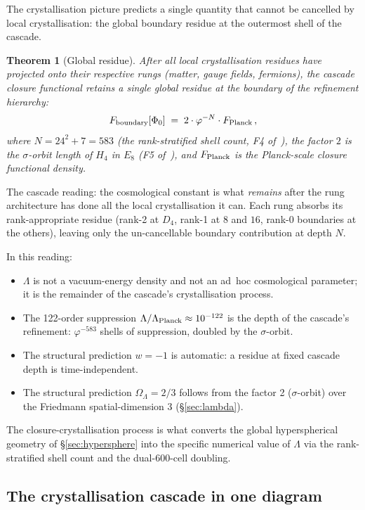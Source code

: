 \documentclass[11pt]{article}
\theoremstyle{plain}
\newtheorem{theorem}{Theorem}[section]
\theoremstyle{definition}
\theoremstyle{remark}
\begin{document}
The crystallisation picture predicts a single quantity that cannot be cancelled by local crystallisation: the global boundary residue at the outermost shell of the cascade.

\begin{theorem}[Global residue]\label{thm:global-residue}
After all local crystallisation residues have projected onto their respective rungs (matter, gauge fields, fermions), the cascade closure functional retains a single global residue at the boundary of the refinement hierarchy:
\[
  F_{\rm boundary}[\Phi_0] \;=\; 2 \cdot \varphi^{-N} \cdot F_{\rm Planck} \,,
\]
where $N = 24^2 + 7 = 583$ (the rank-stratified shell count, F4 of~\citealp{SmartXXXVI}), the factor $2$ is the $\sigma$-orbit length of $H_4$ in $E_8$ (F5 of~\citealp{SmartXXXVI}), and $F_{\rm Planck}$ is the Planck-scale closure functional density.
\end{theorem}

The cascade reading: the cosmological constant is what \emph{remains} after the rung architecture has done all the local crystallisation it can. Each rung absorbs its rank-appropriate residue (rank-2 at $D_4$, rank-1 at $8$ and $16$, rank-0 boundaries at the others), leaving only the un-cancellable boundary contribution at depth $N$.

In this reading:
\begin{itemize}[leftmargin=2em]
\item $\Lambda$ is not a vacuum-energy density and not an ad~hoc cosmological parameter; it is the remainder of the cascade's crystallisation process.
\item The 122-order suppression $\Lambda / \Lambda_{\rm Planck} \approx 10^{-122}$ is the depth of the cascade's refinement: $\varphi^{-583}$ shells of suppression, doubled by the $\sigma$-orbit.
\item The structural prediction $w = -1$ is automatic: a residue at fixed cascade depth is time-independent.
\item The structural prediction $\Omega_\Lambda = 2/3$ follows from the factor 2 ($\sigma$-orbit) over the Friedmann spatial-dimension 3 (\S\ref{sec:lambda}).
\end{itemize}

The closure-crystallisation process is what converts the global hyperspherical geometry of \S\ref{sec:hypersphere} into the specific numerical value of $\Lambda$ via the rank-stratified shell count and the dual-600-cell doubling.

\subsection{The crystallisation cascade in one diagram}\label{sec:cry-diagram}
\end{document}
